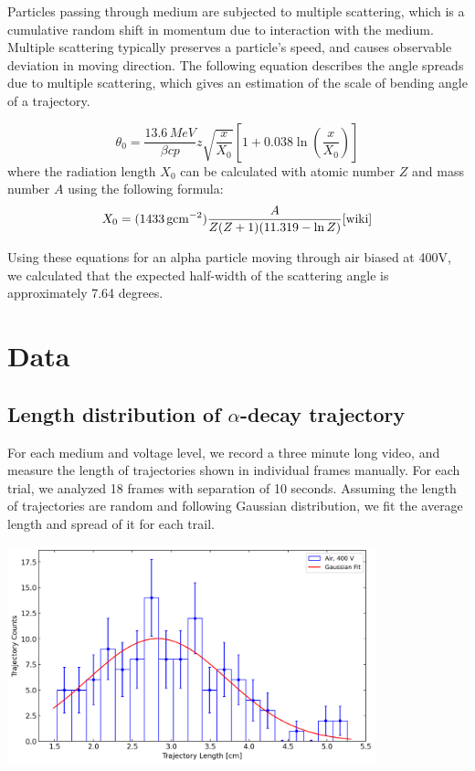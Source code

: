 \documentclass[letterpaper,12pt]{article}
\begin{document}
Particles passing through medium are subjected to multiple scattering, which is a cumulative random shift in momentum due to interaction with the medium. Multiple scattering typically preserves a particle's speed, and causes observable deviation in moving direction. The following equation describes the angle spreads due to multiple scattering, which gives an estimation of the scale of bending angle of a trajectory. 

\begin{equation}
    \theta_0 = \frac{13.6 \,\si{MeV}}{\beta cp}z \sqrt{\frac{x}{X_0}}\left[1+0.038\ln{\left(\frac{x}{X_0}\right)}\right]
    \label{multiscatter}
\end{equation}
where the radiation length $X_0$ can be calculated with atomic number $Z$ and mass number $A$ using the following formula:
\begin{equation}
    X_0 = (1433 \,\si{g cm^{-2}})\frac{A}{Z(Z+1)(11.319-\ln{Z})}\cite{wiki}\label{radiationlength}
\end{equation}

Using these equations for an alpha particle moving through air biased at 400V, we calculated that the expected half-width of the scattering angle is approximately 7.64 degrees.

\section{Data}
\subsection{Length distribution of $\alpha$-decay trajectory}

For each medium and voltage level, we record a three minute long video, and measure the length of trajectories shown in individual frames manually. For each trial, we analyzed 18 frames with separation of 10 seconds. Assuming the length of trajectories are random and following Gaussian distribution, we fit the average length and spread of it for each trail. 
\begin{center}
    \includegraphics[width=0.8\textwidth]{figures/air_400.png}
    \label{fig:air_400}
\end{center}
\end{document}
